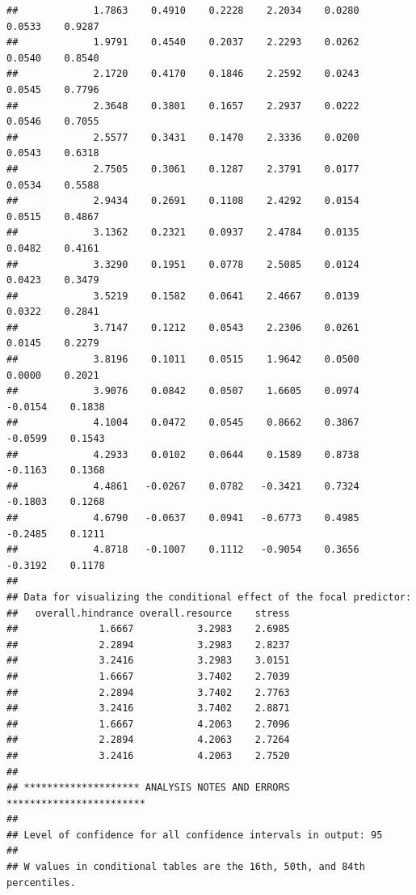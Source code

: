 \documentclass[
  english,
  man]{apa6}
\begin{document}
\begin{verbatim}
##             1.7863    0.4910    0.2228    2.2034    0.0280    0.0533    0.9287
##             1.9791    0.4540    0.2037    2.2293    0.0262    0.0540    0.8540
##             2.1720    0.4170    0.1846    2.2592    0.0243    0.0545    0.7796
##             2.3648    0.3801    0.1657    2.2937    0.0222    0.0546    0.7055
##             2.5577    0.3431    0.1470    2.3336    0.0200    0.0543    0.6318
##             2.7505    0.3061    0.1287    2.3791    0.0177    0.0534    0.5588
##             2.9434    0.2691    0.1108    2.4292    0.0154    0.0515    0.4867
##             3.1362    0.2321    0.0937    2.4784    0.0135    0.0482    0.4161
##             3.3290    0.1951    0.0778    2.5085    0.0124    0.0423    0.3479
##             3.5219    0.1582    0.0641    2.4667    0.0139    0.0322    0.2841
##             3.7147    0.1212    0.0543    2.2306    0.0261    0.0145    0.2279
##             3.8196    0.1011    0.0515    1.9642    0.0500    0.0000    0.2021
##             3.9076    0.0842    0.0507    1.6605    0.0974   -0.0154    0.1838
##             4.1004    0.0472    0.0545    0.8662    0.3867   -0.0599    0.1543
##             4.2933    0.0102    0.0644    0.1589    0.8738   -0.1163    0.1368
##             4.4861   -0.0267    0.0782   -0.3421    0.7324   -0.1803    0.1268
##             4.6790   -0.0637    0.0941   -0.6773    0.4985   -0.2485    0.1211
##             4.8718   -0.1007    0.1112   -0.9054    0.3656   -0.3192    0.1178
## 
## Data for visualizing the conditional effect of the focal predictor:
##   overall.hindrance overall.resource    stress
##              1.6667           3.2983    2.6985
##              2.2894           3.2983    2.8237
##              3.2416           3.2983    3.0151
##              1.6667           3.7402    2.7039
##              2.2894           3.7402    2.7763
##              3.2416           3.7402    2.8871
##              1.6667           4.2063    2.7096
##              2.2894           4.2063    2.7264
##              3.2416           4.2063    2.7520
## 
## ******************** ANALYSIS NOTES AND ERRORS ************************ 
## 
## Level of confidence for all confidence intervals in output: 95
## 
## W values in conditional tables are the 16th, 50th, and 84th percentiles.
\end{verbatim}
\end{document}
